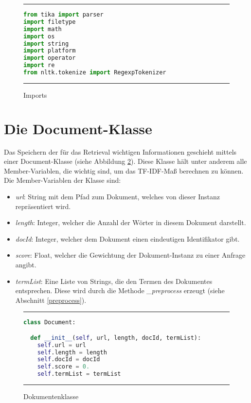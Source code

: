 \begin{figure}
	\rule{\textwidth}{0.4pt}
		\begin{lstlisting}[language=Python]
from tika import parser
import filetype
import math
import os
import string
import platform
import operator
import re
from nltk.tokenize import RegexpTokenizer
		\end{lstlisting}
	\rule{\textwidth}{0.4pt}
	\caption{Imports}
	\label{fig:import}
\end{figure}

\section{Die Document-Klasse}\label{die-document-klasse}

Das Speichern der für das Retrieval wichtigen Informationen geschieht mittels einer Document-Klasse (siehe Abbildung \ref{fig:document}). Diese Klasse hält unter anderem alle Member-Variablen, die wichtig sind, um das TF-IDF-Maß berechnen zu können. Die Member-Variablen der Klasse sind:
\begin{itemize}
	\item \textit{url}: String mit dem Pfad zum Dokument, welches von dieser Instanz repräsentiert wird.
	\item \textit{length}: Integer, welcher die Anzahl der Wörter in diesem Dokument darstellt.
	\item \textit{docId}: Integer, welcher dem Dokument einen eindeutigen Identifikator gibt.
	\item \textit{score}: Float, welcher die Gewichtung der Dokument-Instanz zu einer Anfrage angibt.
	\item \textit{termList}: Eine Liste von Strings, die den Termen des Dokumentes entsprechen. Diese wird durch die Methode \textit{\_preprocess} erzeugt (siehe Abschnitt \ref{preprocess}).
\end{itemize} 

\begin{figure}
	\rule{\textwidth}{0.4pt}
		\begin{lstlisting}[language=Python]
class Document:

  def __init__(self, url, length, docId, termList):
    self.url = url
    self.length = length
    self.docId = docId
    self.score = 0.
    self.termList = termList
		\end{lstlisting}
	\rule{\textwidth}{0.4pt}
	\caption{Dokumentenklasse}
	\label{fig:document}
\end{figure}

